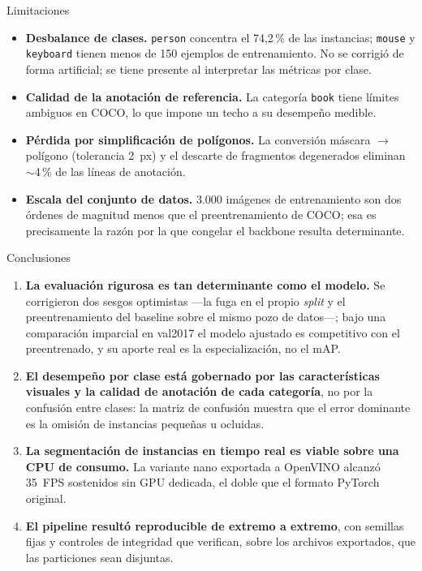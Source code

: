 \documentclass[aspectratio=169,11pt]{beamer}
\begin{document}
\begin{frame}{Limitaciones}
  \begin{itemize}
    \item \textbf{Desbalance de clases.} \texttt{person} concentra el 74,2\,\% de las
          instancias; \texttt{mouse} y \texttt{keyboard} tienen menos de 150 ejemplos de
          entrenamiento. No se corrigió de forma artificial; se tiene presente al
          interpretar las métricas por clase.
    \item \textbf{Calidad de la anotación de referencia.} La categoría \texttt{book} tiene
          límites ambiguos en COCO, lo que impone un techo a su desempeño medible.
    \item \textbf{Pérdida por simplificación de polígonos.} La conversión máscara
          $\rightarrow$ polígono (tolerancia 2~px) y el descarte de fragmentos degenerados
          eliminan $\sim$4\,\% de las líneas de anotación.
    \item \textbf{Escala del conjunto de datos.} 3.000 imágenes de entrenamiento son dos
          órdenes de magnitud menos que el preentrenamiento de COCO; esa es precisamente
          la razón por la que congelar el backbone resulta determinante.
  \end{itemize}
\end{frame}

\begin{frame}{Conclusiones}
  \begin{enumerate}
    \item \textbf{La evaluación rigurosa es tan determinante como el modelo.} Se
          corrigieron dos sesgos optimistas ---la fuga en el propio \emph{split} y el
          preentrenamiento del baseline sobre el mismo pozo de datos---; bajo una
          comparación imparcial en val2017 el modelo ajustado es competitivo con el
          preentrenado, y su aporte real es la especialización, no el mAP.
    \vspace{0.3em}
    \item \textbf{El desempeño por clase está gobernado por las características visuales y
          la calidad de anotación de cada categoría}, no por la confusión entre clases: la
          matriz de confusión muestra que el error dominante es la omisión de instancias
          pequeñas u ocluidas.
    \vspace{0.3em}
    \item \textbf{La segmentación de instancias en tiempo real es viable sobre una CPU de
          consumo.} La variante nano exportada a OpenVINO alcanzó 35~FPS sostenidos sin GPU
          dedicada, el doble que el formato PyTorch original.
    \vspace{0.3em}
    \item \textbf{El pipeline resultó reproducible de extremo a extremo}, con semillas
          fijas y controles de integridad que verifican, sobre los archivos exportados, que
          las particiones sean disjuntas.
  \end{enumerate}
\end{frame}
\end{document}

